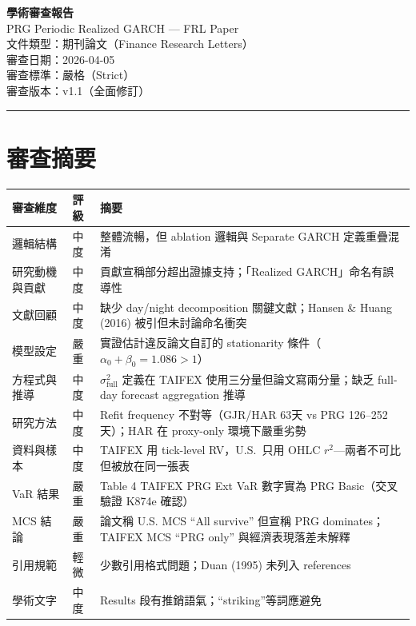 \documentclass[12pt,a4paper]{article}
\begin{document}
\begin{center}
{\Large\bfseries 學術審查報告}\\[0.5em]
{\large PRG Periodic Realized GARCH --- FRL Paper}\\[0.5em]
{\normalsize 文件類型：期刊論文（Finance Research Letters）}\\
{\normalsize 審查日期：2026-04-05}\\
{\normalsize 審查標準：嚴格（Strict）}\\
{\normalsize 審查版本：v1.1（全面修訂）}
\end{center}

\bigskip
\hrule
\bigskip

\section*{審查摘要}

\begin{longtable}{p{4.5cm}p{2cm}p{7.5cm}}
\toprule
\textbf{審查維度} & \textbf{評級} & \textbf{摘要} \\
\midrule
\endhead
邏輯結構 & \textcolor{warncolor}{中度} & 整體流暢，但 ablation 邏輯與 Separate GARCH 定義重疊混淆 \\
研究動機與貢獻 & \textcolor{warncolor}{中度} & 貢獻宣稱部分超出證據支持；「Realized GARCH」命名有誤導性 \\
文獻回顧 & \textcolor{warncolor}{中度} & 缺少 day/night decomposition 關鍵文獻；Hansen \& Huang (2016) 被引但未討論命名衝突 \\
模型設定 & \textcolor{errorred}{嚴重} & 實證估計違反論文自訂的 stationarity 條件（$\alpha_0+\beta_0=1.086>1$） \\
方程式與推導 & \textcolor{warncolor}{中度} & $\sigma^2_\text{full}$ 定義在 TAIFEX 使用三分量但論文寫兩分量；缺乏 full-day forecast aggregation 推導 \\
研究方法 & \textcolor{warncolor}{中度} & Refit frequency 不對等（GJR/HAR 63天 vs PRG 126--252天）；HAR 在 proxy-only 環境下嚴重劣勢 \\
資料與樣本 & \textcolor{warncolor}{中度} & TAIFEX 用 tick-level RV，U.S.\ 只用 OHLC $r^2$---兩者不可比但被放在同一張表 \\
VaR 結果 & \textcolor{errorred}{嚴重} & Table 4 TAIFEX PRG Ext VaR 數字實為 PRG Basic（交叉驗證 K874e 確認） \\
MCS 結論 & \textcolor{errorred}{嚴重} & 論文稱 U.S. MCS ``All survive'' 但宣稱 PRG dominates；TAIFEX MCS ``PRG only'' 與經濟表現落差未解釋 \\
引用規範 & 輕微 & 少數引用格式問題；Duan (1995) 未列入 references \\
學術文字 & \textcolor{warncolor}{中度} & Results 段有推銷語氣；``striking''等詞應避免 \\
\bottomrule
\end{longtable}
\end{document}
